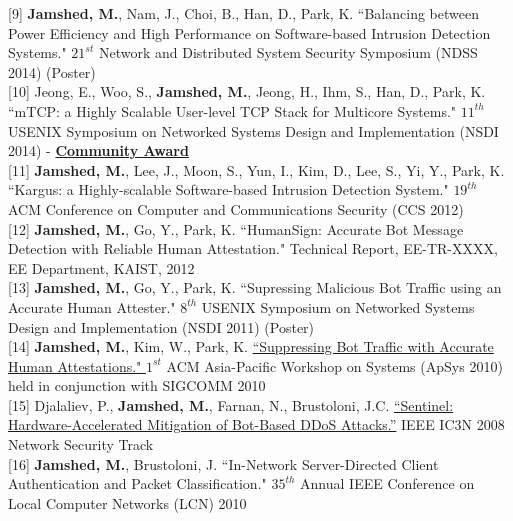 \documentclass[10pt]{article}
\begin{document}
[9] {\bf Jamshed, M.}, Nam, J., Choi, B., Han, D., Park, K.
{ ``Balancing between Power Efficiency and High Performance on Software-based 
  Intrusion Detection Systems." } $21^{st}$ Network and Distributed System 
  Security Symposium (NDSS 2014) (Poster)\\

[10] Jeong, E., Woo, S., {\bf Jamshed, M.}, Jeong, H., Ihm, S., Han, D., Park, K.
{ ``mTCP: a Highly Scalable User-level TCP Stack for Multicore Systems." }
    $11^{th}$ USENIX Symposium on Networked Systems Design and 
    Implementation (NSDI 2014) - \underline{\textbf{Community Award}}\\

[11] {\bf Jamshed, M.}, Lee, J., Moon, S., Yun, I., Kim, D., Lee, S., Yi, Y., Park, K.
{ ``Kargus: a Highly-scalable Software-based Intrusion Detection System." }
    $19^{th}$ ACM Conference on Computer and Communications Security (CCS 2012) \\

[12] {\bf Jamshed, M.}, Go, Y., Park, K.
{ ``HumanSign: Accurate Bot Message Detection with Reliable Human Attestation." }
    Technical Report, EE-TR-XXXX, EE Department, KAIST, 2012 \\

[13] {\bf Jamshed, M.}, Go, Y., Park, K.
{ ``Supressing Malicious Bot Traffic using an Accurate Human Attester." }
     $8^{th}$ USENIX Symposium on Networked Systems Design and Implementation (NSDI 2011) 
     (Poster)\\
     
[14] {\bf Jamshed, M.}, Kim, W., Park, K. 
\href{http://www.ndsl.kaist.edu/~ajamshed/papers/apsys10.pdf}
     { ``Suppressing Bot Traffic with Accurate Human Attestations." }
     $1^{st}$ ACM Asia-Pacific Workshop on Systems (ApSys 2010) 
     held in conjunction with SIGCOMM 2010\\

[15] Djalaliev, P., {\bf Jamshed, M.}, Farnan, N., Brustoloni, J.C. 
	  \href{http://www.ndsl.kaist.edu/~ajamshed/papers/icccn08.pdf}
	    {``Sentinel: Hardware-Accelerated Mitigation of Bot-Based DDoS Attacks.''}
	  IEEE IC3N 2008 Network Security Track \\

[16] {\bf Jamshed, M.}, Brustoloni, J. ``In-Network Server-Directed Client Authentication 
		and Packet Classification." $35^{th}$ Annual IEEE Conference on Local
                Computer Networks (LCN) 2010\\
\end{document}
